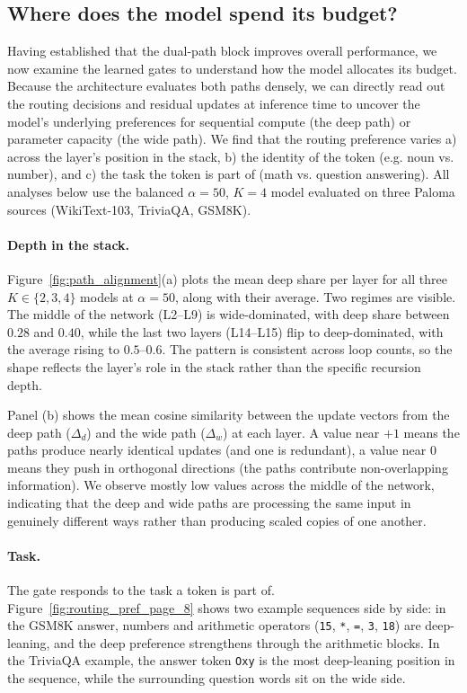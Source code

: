 \documentclass[11pt]{article}
\begin{document}
\subsection{Where does the model spend its budget?}
\label{sec:exp:analysis}

Having established that the dual-path block improves overall performance, we now examine the learned gates to understand how the model allocates its budget. Because the architecture evaluates both paths densely, we can directly read out the routing decisions and residual updates at inference time to uncover the model's underlying preferences for sequential compute (the deep path) or parameter capacity (the wide path). We find that the routing preference varies a) across the layer's position in the stack, b) the identity of the token (e.g. noun vs. number), and c) the task the token is part of (math vs. question answering). All analyses below use the
balanced $\alpha = 50$, $K = 4$ model evaluated on three Paloma
sources (WikiText-103, TriviaQA, GSM8K).

\paragraph{Depth in the stack.}
Figure~\ref{fig:path_alignment}(a) plots the mean deep share per layer for all three $K \in \{2, 3, 4\}$ models at $\alpha = 50$, along with their average. Two regimes are visible. The middle of the network (L2--L9) is wide-dominated, with deep share between $0.28$ and $0.40$, while the last two layers (L14--L15) flip to deep-dominated, with the average rising to $0.5$--$0.6$. The pattern is consistent across loop counts, so the shape reflects the layer's role in the stack rather than the specific recursion depth. 

Panel (b) shows the mean cosine similarity between the update vectors from the deep path ($\Delta_d$) and the wide path ($\Delta_w$) at each layer. A value near $+1$ means the paths produce nearly identical updates (and one is redundant), a value near $0$ means they push in orthogonal directions (the paths contribute non-overlapping information). We observe mostly low values across the middle of the network, indicating that the deep and wide paths are processing the same input in genuinely different ways rather than producing scaled copies of one another.

\paragraph{Task.}
The gate responds to the task a token is part of. Figure~\ref{fig:routing_pref_page_8} shows two example sequences side by side: in the GSM8K answer, numbers and arithmetic operators (\texttt{15}, \texttt{*}, \texttt{=}, \texttt{3}, \texttt{18}) are deep-leaning, and the deep preference strengthens through the arithmetic blocks. In the TriviaQA example, the answer token \texttt{Oxy} is the most deep-leaning position in the sequence, while the surrounding question words sit on the wide side.
\end{document}
